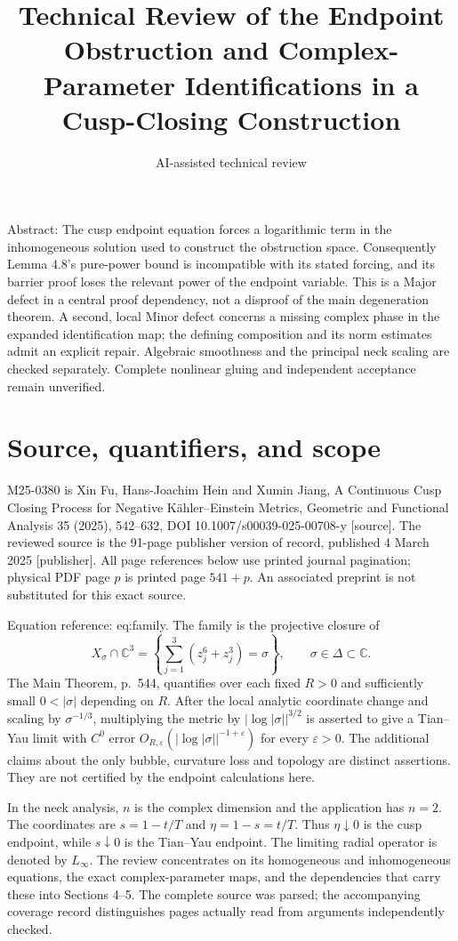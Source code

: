 \documentclass[10pt]{article}
\title{Technical Review of the Endpoint Obstruction and Complex-Parameter Identifications in a Cusp-Closing Construction}
\author{AI-assisted technical review}
\date{}
\begin{document}
\maketitle
Abstract: The cusp endpoint equation forces a logarithmic term in the inhomogeneous solution used to construct the obstruction space. Consequently Lemma 4.8’s pure-power bound is incompatible with its stated forcing, and its barrier proof loses the relevant power of the endpoint variable. This is a Major defect in a central proof dependency, not a disproof of the main degeneration theorem. A second, local Minor defect concerns a missing complex phase in the expanded identification map; the defining composition and its norm estimates admit an explicit repair. Algebraic smoothness and the principal neck scaling are checked separately. Complete nonlinear gluing and independent acceptance remain unverified.\par
\section*{Source, quantifiers, and scope}
M25-0380 is Xin Fu, Hans-Joachim Hein and Xumin Jiang, A Continuous Cusp Closing Process for Negative Kähler–Einstein Metrics, Geometric and Functional Analysis 35 (2025), 542–632, DOI 10.1007/s00039-025-00708-y [source]. The reviewed source is the 91-page publisher version of record, published 4 March 2025 [publisher]. All page references below use printed journal pagination; physical PDF page \(p\) is printed page \(541+p\). An associated preprint is not substituted for this exact source.\par
Equation reference: eq:family. The family is the projective closure of \[X_\sigma\cap\mathbb C^3
 =\left\{\sum_{j=1}^3(z_j^6+z_j^3)=\sigma\right\},
 \qquad \sigma\in\Delta\subset\mathbb C.
 \] The Main Theorem, p. 544, quantifies over each fixed \(R>0\) and sufficiently small \(0<|\sigma|\) depending on \(R\). After the local analytic coordinate change and scaling by \(\sigma^{-1/3}\), multiplying the metric by \(|\log|\sigma||^{3/2}\) is asserted to give a Tian–Yau limit with \(C^0\) error \(O_{R,\varepsilon}(|\log|\sigma||^{-1+\varepsilon})\) for every \(\varepsilon>0\). The additional claims about the only bubble, curvature loss and topology are distinct assertions. They are not certified by the endpoint calculations here.\par
In the neck analysis, \(n\) is the complex dimension and the application has \(n=2\). The coordinates are \(s=1-t/T\) and \(\eta=1-s=t/T\). Thus \(\eta\downarrow0\) is the cusp endpoint, while \(s\downarrow0\) is the Tian–Yau endpoint. The limiting radial operator is denoted by \(L_\infty\). The review concentrates on its homogeneous and inhomogeneous equations, the exact complex-parameter maps, and the dependencies that carry these into Sections 4–5. The complete source was parsed; the accompanying coverage record distinguishes pages actually read from arguments independently checked.\par
\end{document}
